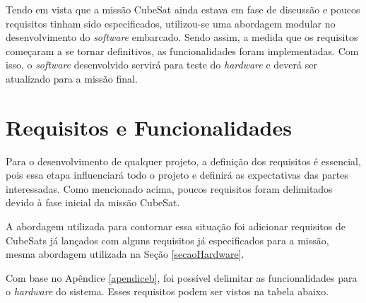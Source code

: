 Tendo em vista que a missão CubeSat ainda estava em fase de discussão e poucos requisitos tinham sido especificados, utilizou-se uma abordagem modular no desenvolvimento do \textit{software} embarcado. Sendo assim, a medida que os requisitos começaram a se tornar definitivos, as funcionalidades foram implementadas. Com isso, o \textit{software} desenvolvido servirá para teste do \textit{hardware} e deverá ser atualizado para a missão final.

\section{Requisitos e Funcionalidades}

Para o desenvolvimento de qualquer projeto, a definição dos requisitos é essencial, pois essa etapa influenciará todo o projeto e definirá as expectativas das partes interessadas. Como mencionado acima, poucos requisitos foram delimitados devido à fase inicial da missão CubeSat.

A abordagem utilizada para contornar essa situação foi adicionar requisitos de CubeSats já lançados com alguns requisitos já especificados para a missão, mesma abordagem utilizada na Seção \ref{secaoHardware}.

Com base no Apêndice \ref{apendiceb}, foi possível delimitar as funcionalidades para o \textit{hardware} do sistema. Esses requisitos podem ser vistos na tabela abaixo.


